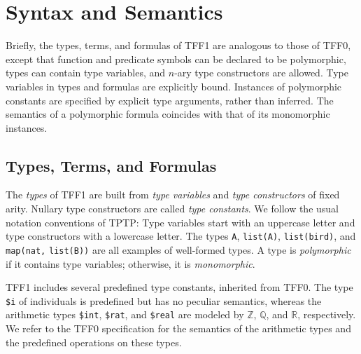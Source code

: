 \section{Syntax and Semantics} \label{sec_logic}

Briefly, the types, terms, and formulas of TFF1 are analogous to those of TFF0,
except that function and predicate symbols can be declared to be polymorphic,
types can contain type variables, and $n$-ary type constructors are allowed.
Type variables in types and formulas are explicitly bound. Instances of
polymorphic constants are specified by explicit type arguments, rather than
inferred. The semantics of a polymorphic formula coincides with that of its
monomorphic instances.

\subsection{Types, Terms, and Formulas}

 The {\em types\/} of TFF1 are built from {\em type
variables\/} and {\em type constructors\/} of fixed arity. Nullary type
constructors are called {\em type constants}. We follow the usual notation
conventions of TPTP\@: Type variables start with an uppercase letter and type
constructors with a lowercase letter. The types \verb+A+, \verb+list(A)+,
\verb+list(bird)+, and \verb+map(nat,+ \verb+list(B))+ are all examples of
well-formed types. A type is {\em polymorphic} if it contains type variables;
otherwise, it is {\em monomorphic}.


TFF1 includes several predefined type constants, inherited from TFF0.
The type {\tt \$i} %
of individuals is predefined but has no peculiar semantics, whereas the
arithmetic types
{\tt \$int}, {\tt \$rat}, and {\tt \$real} are modeled by $\mathbb{Z}$,
$\mathbb{Q}$, and $\mathbb{R}$, respectively. We refer
to the TFF0 specification \cite{TFF0} for the semantics of
the arithmetic types and the predefined operations on
these types. %


